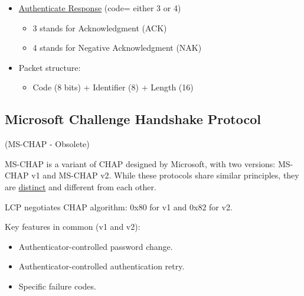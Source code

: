 \begin{tcolorbox}[colback=yellow!10!white, colframe=yellow!70!black, title=Authenticator \textrightarrow Peer] 
    
    \begin{itemize}
        \item \underline{Authenticate Response} (code= either 3 or 4)
        \begin{itemize}
            \item 3 stands for Acknowledgment (ACK)
            \item 4 stands for Negative Acknowledgment (NAK)
        \end{itemize}
        \item Packet structure:
        \begin{itemize}
            \item Code (8 bits) + Identifier (8) + Length (16)
        \end{itemize}
    \end{itemize}
\end{tcolorbox}

\clearpage
\subsection{Microsoft Challenge Handshake Protocol}
\begin{center}
    (MS-CHAP - Obsolete)
\end{center}

MS-CHAP is a variant of CHAP designed by Microsoft, with two versions: MS-CHAP v1 and MS-CHAP v2. While these protocols share similar principles, they are \underline{distinct} and different from each other.

LCP negotiates CHAP algorithm: 0x80 for v1 and 0x82 for v2.

Key features in common (v1 and v2):
\begin{itemize}
    \item Authenticator-controlled password change.
    \item Authenticator-controlled authentication retry.
    \item Specific failure codes.
\end{itemize}


